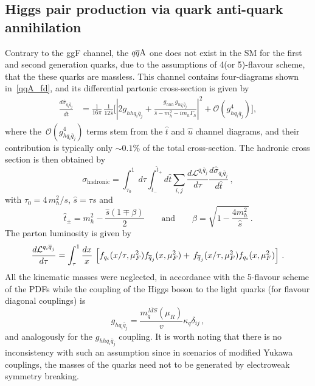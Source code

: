 \subsection{Higgs pair production via quark anti-quark annihilation}
Contrary to the ggF channel, the $\qqA$ one does not exist in the SM for the first and second generation quarks, due to the assumptions of 4(or 5)-flavour scheme, that the these quarks are massless.  This channel contains four-diagrams shown in~\autoref{qqA_fd}, and its  differential partonic cross-section is given by 
\begin{align}
	\frac{d \hat \sigma_{q_i\bar{q}_j}}{d \hat t} &= \frac{1}{16 \pi}\, \frac{1}{12  \hat{s}} \bigg[ \left| 2  g_{hh q_i \bar q_j} + \frac{g_{hhh}\, g_{h q_i \bar q_j}}{\hat{s}-m_h^2-im_h\Gamma_h}\right|^2+ \mathcal{O}(g_{h q_i \bar q_j}^4) \bigg],
	\label{sigmaqqa}
\end{align}
where the~$ \mathcal{O}(g_{h q_i \bar q_j}^4)$ terms stem from the $\hat{t}$ and $\hat{u}$ channel diagrams, and their contribution is typically only $\sim 0.1 \%$ of the total cross-section.
The hadronic cross section is then obtained by
\begin{equation}
	\sigma_{\mathrm{hadronic}} =  \int_{\tau_0}^1 d\tau \int_{\hat{t}_-}^{\hat{t}_+} d\hat{t} \sum_{i,j} \frac{d\mathcal{L}^{q_i\bar{q}_j}}{d\tau}\frac{ d\hat \sigma_{q_i\bar{q}_j}}{d \hat t}\,, \label{eq:sigmahadron}
\end{equation}
with $ \tau_0= 4\, m_h^2/s$, $\hat{s}=\tau s$ and
\begin{equation}
	\hat{t}_{\pm}=m_h^2-\frac{\hat{s}(1\mp \beta)}{2} \quad\quad \text{and}\quad \quad \beta=\sqrt{1-\frac{4 m_h^2}{\hat{s}}}\,.
\end{equation}
The parton luminosity is given by
\begin{equation}
	\frac{d{\cal L}^{q_i \bar q_j}}{d\tau} = \int_\tau ^1 \frac{dx}{x} \,\left[  f_{q_i}(x/\tau,\mu_F^2) f_{\bar{q}_j}(x,\mu_F^2) + \,f_{\bar{q}_j}(x/\tau,\mu_F^2) f_{q_i}(x,\mu_F^2)\right]\,.
\end{equation}
All the kinematic masses were neglected, in accordance with the 5-flavour scheme of the PDFs while the coupling of the Higgs boson to the light quarks (for flavour diagonal couplings) is
\begin{equation}
	g_{hq_i\bar{q}_j}=\frac{m^{\bar{MS}}_q(\mu_R)}{v}  \kappa_q \delta_{ij}\,,
\end{equation}
and analogously for the $g_{hhq_i\bar{q}_j}$ coupling.  It is worth noting that there is no inconsistency with such an assumption since in scenarios of modified Yukawa couplings, the masses of the quarks need not to be generated by electroweak symmetry breaking.
